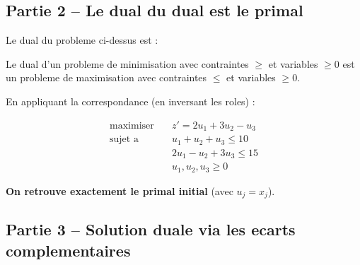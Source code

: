 \documentclass[12pt,a4paper]{article}
\begin{document}
\subsection{Partie 2 -- Le dual du dual est le primal}

\begin{correction}
Le dual du probleme ci-dessus est :

Le dual d'un probleme de minimisation avec contraintes $\geq$ et variables $\geq 0$ est un probleme de maximisation avec contraintes $\leq$ et variables $\geq 0$.

En appliquant la correspondance (en inversant les roles) :

\begin{align*}
\text{maximiser} \quad & z' = 2u_1 + 3u_2 - u_3\\
\text{sujet a} \quad & u_1 + u_2 + u_3 \leq 10\\
& 2u_1 - u_2 + 3u_3 \leq 15\\
& u_1, u_2, u_3 \geq 0
\end{align*}

\textcolor{defvert}{\textbf{On retrouve exactement le primal initial}} (avec $u_j = x_j$). 
\end{correction}

\subsection{Partie 3 -- Solution duale via les ecarts complementaires}
\end{document}

